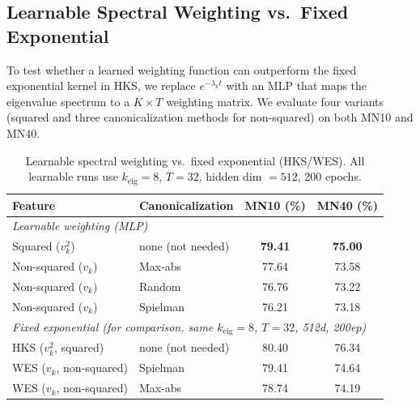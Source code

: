 \documentclass[11pt]{article}
\begin{document}
\subsection{Learnable Spectral Weighting vs.\ Fixed Exponential}

To test whether a learned weighting function can outperform the fixed exponential kernel in
HKS, we replace $e^{-\lambda_k t}$ with an MLP that maps the eigenvalue spectrum to a
$K \times T$ weighting matrix. We evaluate four variants (squared and three
canonicalization methods for non-squared) on both MN10 and MN40.

\begin{table}[ht]
\centering
\caption{Learnable spectral weighting vs.\ fixed exponential (HKS/WES).
All learnable runs use $k_{\text{eig}} = 8$, $T = 32$, hidden dim $= 512$, 200 epochs.}
\label{tab:learnable}
\begin{tabular}{llcc}
\toprule
\textbf{Feature} & \textbf{Canonicalization} & \textbf{MN10 (\%)} & \textbf{MN40 (\%)} \\
\midrule
\multicolumn{4}{l}{\emph{Learnable weighting (MLP)}} \\
\quad Squared ($v_k^2$) & none (not needed) & \textbf{79.41} & \textbf{75.00} \\
\quad Non-squared ($v_k$) & Max-abs & 77.64 & 73.58 \\
\quad Non-squared ($v_k$) & Random & 76.76 & 73.22 \\
\quad Non-squared ($v_k$) & Spielman & 76.21 & 73.18 \\
\midrule
\multicolumn{4}{l}{\emph{Fixed exponential (for comparison, same $k_{\text{eig}}{=}8$, $T{=}32$, 512d, 200ep)}} \\
\quad HKS ($v_k^2$, squared) & none (not needed) & 80.40 & 76.34 \\
\quad WES ($v_k$, non-squared) & Spielman & 79.41 & 74.64 \\
\quad WES ($v_k$, non-squared) & Max-abs & 78.74 & 74.19 \\
\bottomrule
\end{tabular}
\end{table}
\end{document}
